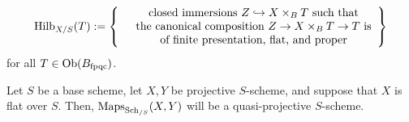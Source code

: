             $$
                \Hilb_{X/S}(T) :=
                \left\{
                    \begin{array}{cc}
                         & \text{closed immersions $Z \hookrightarrow X \x_{B} T$ such that}
                         \\
                         & \text{the canonical composition $Z \to X \x_{B} T \to T$ is}
                         \\
                         & \text{of finite presentation, flat, and proper}
                    \end{array}
                \right\}
            $$
        for all $T \in \mathrm{Ob}(B_{\mathrm{fpqc}})$.
        \begin{theorem}
            Let $S$ be a base scheme, let $X, Y$ be projective $S$-scheme, and suppose that $X$ is flat over $S$. Then, $\mathrm{Maps}_{\mathrm{Sch}_{/S}}(X, Y)$ will be a quasi-projective $S$-scheme.
        \end{theorem}
